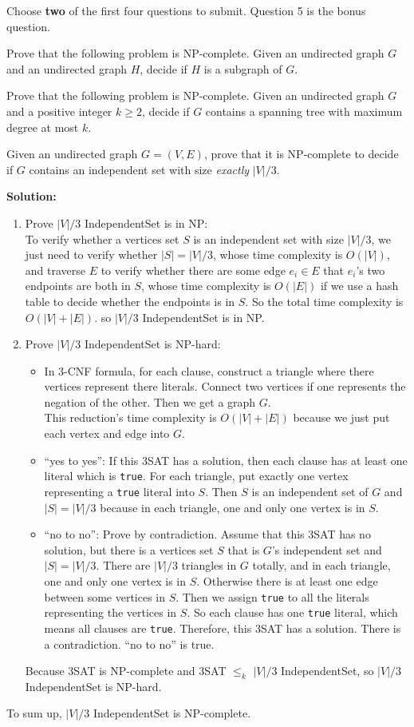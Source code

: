 \documentclass{oxmathproblems}
\begin{document}
Choose \textbf{two} of the first four questions to submit.
Question 5 is the bonus question.

\begin{questions}


\miquestion
Prove that the following problem is NP-complete.
Given an undirected graph $G$ and an undirected graph $H$, decide if $H$ is a subgraph of $G$.

\miquestion
Prove that the following problem is NP-complete.
Given an undirected graph $G$ and a positive integer $k\geq 2$, decide if $G$ contains a spanning tree with maximum degree at most $k$.

\miquestion
Given an undirected graph $G=(V,E)$, prove that it is NP-complete to decide if $G$ contains an independent set with size \emph{exactly} $|V|/3$.

\textbf{Solution:}
\begin{enumerate}
  \item Prove $|V|/3$ IndependentSet is in NP:\\
  To verify whether a vertices set $S$ is an independent set with size $|V|/3$, we just need to verify whether $|S| = |V|/3$, whose time complexity is $O(|V|)$, and traverse $E$ to verify whether there are some edge $e_i \in E$ that $e_i$'s two endpoints are both in $S$, whose time complexity is $O(|E|)$ if we use a hash table to decide whether the endpoints is in $S$. So the total time complexity is $O(|V|+|E|)$. so $|V|/3$ IndependentSet is in NP.
  \item Prove $|V|/3$ IndependentSet is NP-hard:
  \begin{itemize}
    \item In 3-CNF formula, for each clause, construct a triangle where there vertices represent there literals. Connect two vertices if one represents the negation of the other. Then we get a graph $G$.\\
    This reduction's time complexity is $O(|V|+|E|)$ because we just put each vertex and edge into $G$.
    \item ``yes to yes'': If this 3SAT has a solution, then each clause has at least one literal which is \texttt{true}. For each triangle, put exactly one vertex representing a \texttt{true} literal into $S$. Then $S$ is an independent set of $G$ and $|S| = |V|/3$ because in each triangle, one and only one vertex is in $S$.
    \item ``no to no'': Prove by contradiction. Assume that this 3SAT has no solution, but there is a vertices set $S$ that is $G$'s independent set and $|S| = |V|/3$. There are $|V|/3$ triangles in $G$ totally, and in each triangle, one and only one vertex is in $S$. Otherwise there is at least one edge between some vertices in $S$. Then we assign \texttt{true} to all the literals representing the vertices in $S$. So each clause has one \texttt{true} literal, which means all clauses are \texttt{true}. Therefore, this 3SAT has a solution. There is a contradiction. ``no to no'' is true.
  \end{itemize}
  Because 3SAT is NP-complete and 3SAT $\leq_k$ $|V|/3$ IndependentSet, so $|V|/3$ IndependentSet is NP-hard.
\end{enumerate}
To sum up, $|V|/3$ IndependentSet is NP-complete.


\end{questions}
\end{document}
